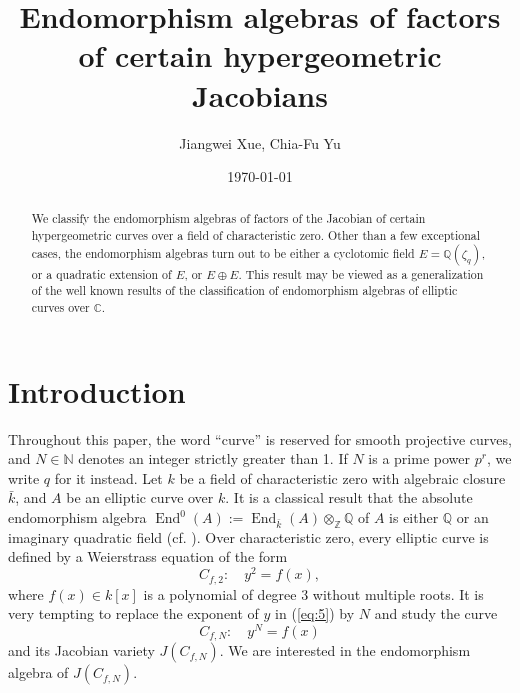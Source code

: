 \documentclass{amsart}[11pt]
\title[Endomorphism algebra of Jacobian]{Endomorphism algebras of
  factors of certain hypergeometric Jacobians}
\author{Jiangwei Xue, Chia-Fu Yu}
\theoremstyle{definition}
\numberwithin{equation}{section}
\theoremstyle{notitle}
\begin{document}
\date{\today}

\begin{abstract}
   We classify the endomorphism algebras of factors of the Jacobian of
   certain hypergeometric curves over a field of characteristic
   zero. Other than a few exceptional cases, the endomorphism algebras
   turn out to be either a cyclotomic field $E=\mathbb{Q}(\zeta_q)$, or
   a quadratic extension of $E$, or $E\oplus E$. This result may be
   viewed as a generalization of the well known results of the
   classification of endomorphism algebras of elliptic curves over
   $\mathbb{C}$.
 \end{abstract}
\maketitle

\section{Introduction}
Throughout this paper, the word ``curve'' is reserved for smooth
projective curves, and $N\in {\mathbb{N}}$ denotes an integer strictly greater
than 1. If $N$ is a prime power $p^r$, we write $q$ for it instead.
Let $k$ be a field of characteristic zero with algebraic closure
$\bar{k}$, and $A$ be an elliptic curve over $k$.  It is a classical
result that the absolute endomorphism algebra
$\operatorname{End}^0(A):=\operatorname{End}_{\bar{k}}(A)\otimes_{\mathbb{Z}} {\mathbb{Q}}$ of $A$ is either ${\mathbb{Q}}$
or an imaginary quadratic field (cf. \cite[Theorem 5.5]{MR2514094}).
Over characteristic zero, every elliptic curve is defined by a
Weierstrass equation of the form
\begin{equation}
  \label{eq:5}
C_{f,2}: \quad y^2=f(x),
\end{equation}
where $f(x)\in k[x]$ is a polynomial of degree $3$ without multiple
roots.  It is very tempting to replace the exponent of $y$ in
(\ref{eq:5}) by $N$ and study the curve 
\begin{equation}
  \label{eq:8}
  C_{f,N}: \quad  y^N=f(x)
\end{equation}
and its Jacobian variety $J(C_{f,N})$. We are interested
in the endomorphism algebra of
$J(C_{f,N})$.  
\end{document}
